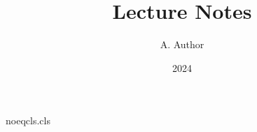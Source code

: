 \begin{filecontents*}[overwrite]{noeqcls.cls}
\def\@maketitle{%
  \begin{center}
    {\LARGE \@title \par}
    \@tempcnta\@date\relax A=\the\@tempcnta\par
    \@tempcntb=1 \advance\@tempcntb\@date B=\the\@tempcntb\par
    \@tempcntb=2 \multiply\@tempcntb\@date C=\the\@tempcntb\par
    \count255 \@date D=\the\count255\par
    \dimen@\@date pt W=\the\dimen@\par
    \@tempcntb=4048 \divide\@tempcntb\@date Q=\the\@tempcntb\par
    \ifodd\@date E-odd\else E-even\fi\par
    \@tempcnta=-\@date G=\the\@tempcnta\par
  \end{center}\par}
\end{filecontents*}
\documentclass{noeqcls}
\title{Lecture Notes}
\author{A. Author}
\date{2024}

\maketitle
Text.

